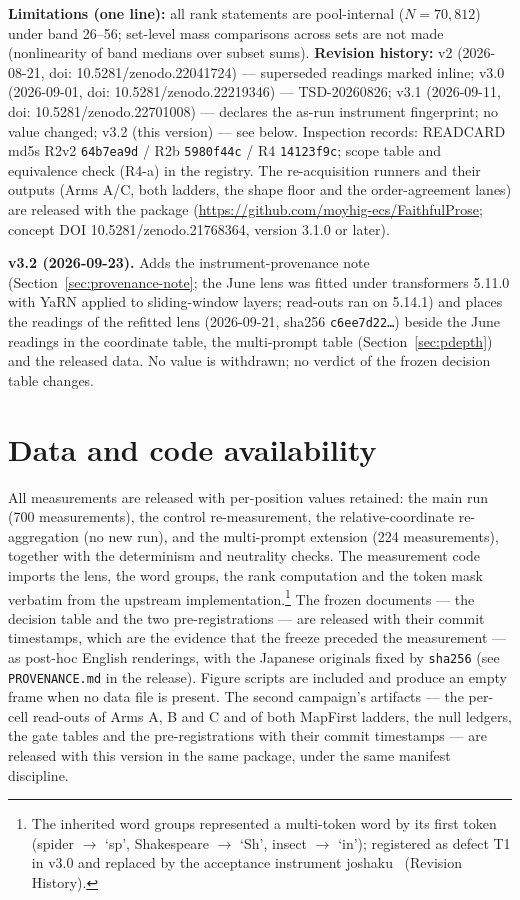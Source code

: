 \documentclass[11pt]{article}
\newcommand{\REPOURL}{\url{https://github.com/moyhig-ecs/FaithfulProse}}
\begin{document}
\noindent\textbf{Limitations (one line):} all rank statements are
pool-internal ($N = 70{,}812$) under band 26--56; set-level mass comparisons
across sets are not made (nonlinearity of band medians over subset sums).
\textbf{Revision history:} v2 (2026-08-21, doi: 10.5281/zenodo.22041724) ---
superseded readings marked inline; v3.0 (2026-09-01, doi:
10.5281/zenodo.22219346) --- TSD-20260826; v3.1 (2026-09-11, doi:
10.5281/zenodo.22701008) --- declares the as-run instrument fingerprint; no
value changed; v3.2 (this version) --- see below.
Inspection records: READCARD md5s R2v2 \texttt{64b7ea9d} / R2b
\texttt{5980f44c} / R4 \texttt{14123f9c}; scope table and equivalence check
(R4-a) in the registry. The re-acquisition runners and their outputs
(Arms A/C, both ladders, the shape floor and the order-agreement lanes) are
released with the package (\REPOURL{}; concept DOI 10.5281/zenodo.21768364,
version 3.1.0 or later).

\noindent\textbf{v3.2 (2026-09-23).} Adds the instrument-provenance note
(Section~\ref{sec:provenance-note}; the June lens was fitted under
transformers 5.11.0 with YaRN applied to sliding-window layers; read-outs
ran on 5.14.1) and places the readings of the refitted lens (2026-09-21,
sha256 \texttt{c6ee7d22\ldots}) beside the June readings in the coordinate
table, the multi-prompt table (Section~\ref{sec:pdepth}) and the released data. No value is withdrawn; no
verdict of the frozen decision table changes.

\section*{Data and code availability}

All measurements are released with per-position values retained: the main
run (700 measurements), the control re-measurement, the relative-coordinate
re-aggregation (no new run), and the multi-prompt extension (224
measurements), together with the determinism and neutrality checks. The
measurement code imports the lens, the word groups, the rank computation
and the token mask verbatim from the upstream implementation.\footnote{The inherited word groups represented a multi-token word by its first token (spider $\to$ `sp', Shakespeare $\to$ `Sh', insect $\to$ `in'); registered as defect T1 in v3.0 and replaced by the acceptance instrument joshaku~\cite{joshaku2026} (Revision History).} The frozen
documents --- the decision table and the two pre-registrations --- are
released with their commit timestamps, which are the evidence that the
freeze preceded the measurement --- as post-hoc English renderings, with the
Japanese originals fixed by \texttt{sha256} (see \texttt{PROVENANCE.md} in the
release). Figure scripts are included and produce an empty frame when no data
file is present.
The second campaign's artifacts --- the per-cell read-outs of Arms A, B and C and of both MapFirst ladders, the null ledgers, the gate tables and the pre-registrations with their commit timestamps --- are released with this version in the same package, under the same manifest discipline.
\end{document}
